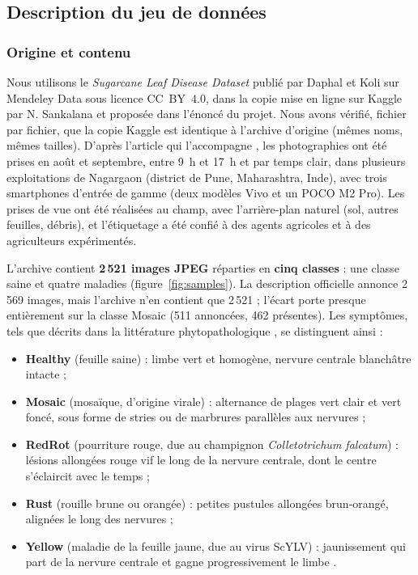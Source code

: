 \subsection{Description du jeu de données}
\label{sec:dataset}

\subsubsection{Origine et contenu}

Nous utilisons le \emph{Sugarcane Leaf Disease Dataset} publié par Daphal et Koli sur Mendeley Data \cite{daphal2022sugarcane} sous licence CC~BY~4.0, dans la copie mise en ligne sur Kaggle par N. Sankalana \cite{sankalana2024sugarcane} et proposée dans l'énoncé du projet. Nous avons vérifié, fichier par fichier, que la copie Kaggle est identique à l'archive d'origine (mêmes noms, mêmes tailles). D'après l'article qui l'accompagne \cite{daphal2023enhancing}, les photographies ont été prises en août et septembre, entre 9~h et 17~h et par temps clair, dans plusieurs exploitations de Nagargaon (district de Pune, Maharashtra, Inde), avec trois smartphones d'entrée de gamme (deux modèles Vivo et un POCO M2 Pro). Les prises de vue ont été réalisées au champ, avec l'arrière-plan naturel (sol, autres feuilles, débris), et l'étiquetage a été confié à des agents agricoles et à des agriculteurs expérimentés.

L'archive contient \textbf{2\,521 images JPEG} réparties en \textbf{cinq classes} : une classe saine et quatre maladies (figure~\ref{fig:samples}). La description officielle annonce 2\,569 images, mais l'archive n'en contient que 2\,521 ; l'écart porte presque entièrement sur la classe Mosaic (511 annoncées, 462 présentes). Les symptômes, tels que décrits dans la littérature phytopathologique \cite{rott2000guide, viswanathan2011sugarcane}, se distinguent ainsi :
\begin{itemize}
  \item \textbf{Healthy} (feuille saine) : limbe vert et homogène, nervure centrale blanchâtre intacte ;
  \item \textbf{Mosaic} (mosaïque, d'origine virale) : alternance de plages vert clair et vert foncé, sous forme de stries ou de marbrures parallèles aux nervures \cite{viswanathan2005mosaic} ;
  \item \textbf{RedRot} (pourriture rouge, due au champignon \emph{Colletotrichum falcatum}) : lésions allongées rouge vif le long de la nervure centrale, dont le centre s'éclaircit avec le temps \cite{viswanathan2021redrot} ;
  \item \textbf{Rust} (rouille brune ou orangée) : petites pustules allongées brun-orangé, alignées le long des nervures \cite{hoy2009brownrust, zhao2011orangerust} ;
  \item \textbf{Yellow} (maladie de la feuille jaune, due au virus ScYLV) : jaunissement qui part de la nervure centrale et gagne progressivement le limbe \cite{rassaby2003yellow, elsayed2015scylv}.
\end{itemize}

